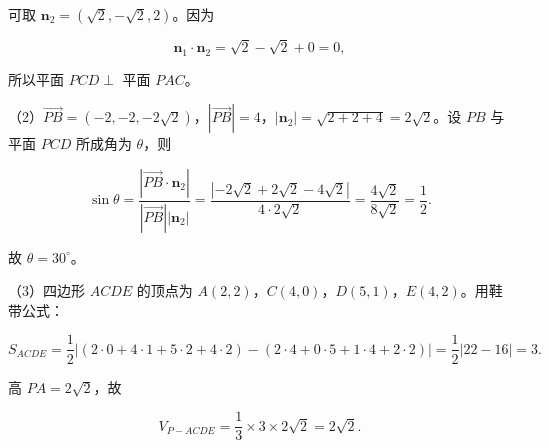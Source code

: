\begin{answer}
可取 $\boldsymbol n_2=(\sqrt2,-\sqrt2,2)$。因为

\nopagebreak[4]
\[\boldsymbol n_1\cdot\boldsymbol n_2=\sqrt2-\sqrt2+0=0,\]

所以平面 $PCD\perp$ 平面 $PAC$。

（2）$\overrightarrow{PB}=(-2,-2,-2\sqrt2)$，$|\overrightarrow{PB}|=4$，$|\boldsymbol n_2|=\sqrt{2+2+4}=2\sqrt2$。设 $PB$ 与平面 $PCD$ 所成角为 $\theta$，则

\nopagebreak[4]
\[\sin\theta=\frac{|\overrightarrow{PB}\cdot\boldsymbol n_2|}{|\overrightarrow{PB}||\boldsymbol n_2|}
=\frac{|{-2\sqrt2}+2\sqrt2-4\sqrt2|}{4\cdot2\sqrt2}
=\frac{4\sqrt2}{8\sqrt2}=\frac12.\]

故 $\theta=30^\circ$。

（3）四边形 $ACDE$ 的顶点为 $A(2,2)$，$C(4,0)$，$D(5,1)$，$E(4,2)$。用鞋带公式：

\nopagebreak[4]
\[S_{ACDE}=\frac12\left|(2\cdot0+4\cdot1+5\cdot2+4\cdot2)-(2\cdot4+0\cdot5+1\cdot4+2\cdot2)\right|
=\frac12|22-16|=3.\]

高 $PA=2\sqrt2$，故

\nopagebreak[4]
\[V_{P-ACDE}=\frac13\times3\times2\sqrt2=2\sqrt2.\]


\end{answer}
